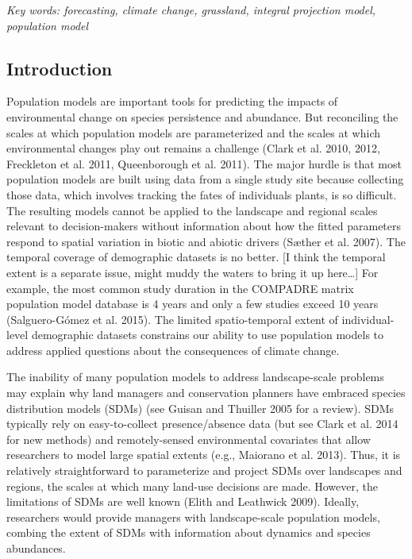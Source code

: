 \documentclass[12pt,]{article}
\begin{document}
\emph{Key words: forecasting, climate change, grassland, integral
projection model, population model}

\subsection{Introduction}\label{introduction}

Population models are important tools for predicting the impacts of
environmental change on species persistence and abundance. But
reconciling the scales at which population models are parameterized and
the scales at which environmental changes play out remains a challenge
(Clark et al. 2010, 2012, Freckleton et al. 2011, Queenborough et al.
2011). The major hurdle is that most population models are built using
data from a single study site because collecting those data, which
involves tracking the fates of individuals plants, is so difficult. The
resulting models cannot be applied to the landscape and regional scales
relevant to decision-makers without information about how the fitted
parameters respond to spatial variation in biotic and abiotic drivers
(Sæther et al. 2007). The temporal coverage of demographic datasets is
no better. {[}I think the temporal extent is a separate issue, might
muddy the waters to bring it up here\ldots{}{]} For example, the most
common study duration in the COMPADRE matrix population model database
is 4 years and only a few studies exceed 10 years (Salguero-Gómez et al.
2015). The limited spatio-temporal extent of individual-level
demographic datasets constrains our ability to use population models to
address applied questions about the consequences of climate change.

The inability of many population models to address landscape-scale
problems may explain why land managers and conservation planners have
embraced species distribution models (SDMs) (see Guisan and Thuiller
2005 for a review). SDMs typically rely on easy-to-collect
presence/absence data (but see Clark et al. 2014 for new methods) and
remotely-sensed environmental covariates that allow researchers to model
large spatial extents (e.g., Maiorano et al. 2013). Thus, it is
relatively straightforward to parameterize and project SDMs over
landscapes and regions, the scales at which many land-use decisions are
made. However, the limitations of SDMs are well known (Elith and
Leathwick 2009). Ideally, researchers would provide managers with
landscape-scale population models, combing the extent of SDMs with
information about dynamics and species abundances.
\end{document}
